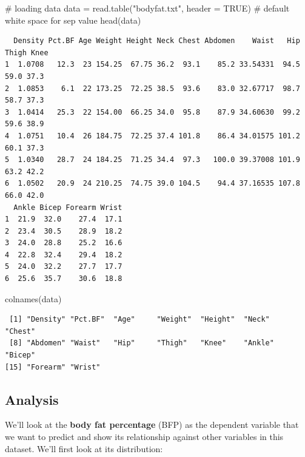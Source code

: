 \documentclass[
  letterpaper,
  DIV=11,
  numbers=noendperiod]{scrartcl}
\newenvironment{Shaded}{\begin{snugshade}}{\end{snugshade}}
\newcommand{\AttributeTok}[1]{\textcolor[rgb]{0.40,0.45,0.13}{#1}}
\newcommand{\CommentTok}[1]{\textcolor[rgb]{0.37,0.37,0.37}{#1}}
\newcommand{\ConstantTok}[1]{\textcolor[rgb]{0.56,0.35,0.01}{#1}}
\newcommand{\FunctionTok}[1]{\textcolor[rgb]{0.28,0.35,0.67}{#1}}
\newcommand{\NormalTok}[1]{\textcolor[rgb]{0.00,0.23,0.31}{#1}}
\newcommand{\OtherTok}[1]{\textcolor[rgb]{0.00,0.23,0.31}{#1}}
\newcommand{\StringTok}[1]{\textcolor[rgb]{0.13,0.47,0.30}{#1}}
\begin{document}
\begin{Shaded}
\begin{Highlighting}[]
\CommentTok{\# loading data}
\NormalTok{data }\OtherTok{=} \FunctionTok{read.table}\NormalTok{(}\StringTok{"bodyfat.txt"}\NormalTok{, }\AttributeTok{header =} \ConstantTok{TRUE}\NormalTok{) }\CommentTok{\# default white space for sep value}
\FunctionTok{head}\NormalTok{(data)}
\end{Highlighting}
\end{Shaded}

\begin{verbatim}
  Density Pct.BF Age Weight Height Neck Chest Abdomen    Waist   Hip Thigh Knee
1  1.0708   12.3  23 154.25  67.75 36.2  93.1    85.2 33.54331  94.5  59.0 37.3
2  1.0853    6.1  22 173.25  72.25 38.5  93.6    83.0 32.67717  98.7  58.7 37.3
3  1.0414   25.3  22 154.00  66.25 34.0  95.8    87.9 34.60630  99.2  59.6 38.9
4  1.0751   10.4  26 184.75  72.25 37.4 101.8    86.4 34.01575 101.2  60.1 37.3
5  1.0340   28.7  24 184.25  71.25 34.4  97.3   100.0 39.37008 101.9  63.2 42.2
6  1.0502   20.9  24 210.25  74.75 39.0 104.5    94.4 37.16535 107.8  66.0 42.0
  Ankle Bicep Forearm Wrist
1  21.9  32.0    27.4  17.1
2  23.4  30.5    28.9  18.2
3  24.0  28.8    25.2  16.6
4  22.8  32.4    29.4  18.2
5  24.0  32.2    27.7  17.7
6  25.6  35.7    30.6  18.8
\end{verbatim}

\begin{Shaded}
\begin{Highlighting}[]
\FunctionTok{colnames}\NormalTok{(data)}
\end{Highlighting}
\end{Shaded}

\begin{verbatim}
 [1] "Density" "Pct.BF"  "Age"     "Weight"  "Height"  "Neck"    "Chest"  
 [8] "Abdomen" "Waist"   "Hip"     "Thigh"   "Knee"    "Ankle"   "Bicep"  
[15] "Forearm" "Wrist"  
\end{verbatim}

\subsection{Analysis}\label{analysis}

We'll look at the \textbf{body fat percentage} (BFP) as the dependent
variable that we want to predict and show its relationship against other
variables in this dataset. We'll first look at its distribution:
\end{document}
